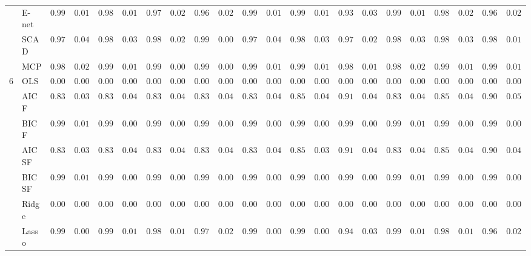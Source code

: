 \begin{tabular}{ll|ll|llllll|llllll|llllll}
 & E-net  & $0.9943$ & $0.0145$ & $0.9883$ & $0.0195$ & $0.9778$ & $0.0222$ & $0.9696$ & $0.0268$ & $0.9934$ & $0.0124$ & $0.9906$ & $0.0145$ & $0.9311$ & $0.0361$ & $0.9907$ & $0.0168$ & $0.9804$ & $0.0229$ & $0.9617$ & $0.0225$ \\
 & SCAD  & $0.9791$ & $0.0413$ & $0.9828$ & $0.0353$ & $0.9889$ & $0.0207$ & $0.9972$ & $0.0082$ & $0.9785$ & $0.0443$ & $0.9846$ & $0.0384$ & $0.9727$ & $0.0277$ & $0.9834$ & $0.0349$ & $0.9840$ & $0.0310$ & $0.9826$ & $0.0174$ \\
 & MCP  & $0.9898$ & $0.0211$ & $0.9915$ & $0.0193$ & $0.9962$ & $0.0095$ & $0.9984$ & $0.0050$ & $0.9911$ & $0.0176$ & $0.9931$ & $0.0173$ & $0.9850$ & $0.0168$ & $0.9895$ & $0.0234$ & $0.9928$ & $0.0159$ & $0.9900$ & $0.0106$ \\\hline
6 & OLS  & $0.0000$ & $0.0000$ & $0.0000$ & $0.0000$ & $0.0000$ & $0.0000$ & $0.0000$ & $0.0000$ & $0.0000$ & $0.0000$ & $0.0000$ & $0.0000$ & $0.0000$ & $0.0000$ & $0.0000$ & $0.0000$ & $0.0000$ & $0.0000$ & $0.0000$ & $0.0000$ \\
 & AIC F  & $0.8329$ & $0.0391$ & $0.8353$ & $0.0419$ & $0.8341$ & $0.0421$ & $0.8306$ & $0.0481$ & $0.8366$ & $0.0447$ & $0.8506$ & $0.0408$ & $0.9124$ & $0.0434$ & $0.8367$ & $0.0438$ & $0.8538$ & $0.0428$ & $0.9071$ & $0.0505$ \\
 & BIC F  & $0.9905$ & $0.0112$ & $0.9928$ & $0.0099$ & $0.9919$ & $0.0087$ & $0.9922$ & $0.0088$ & $0.9906$ & $0.0098$ & $0.9932$ & $0.0076$ & $0.9960$ & $0.0061$ & $0.9901$ & $0.0103$ & $0.9929$ & $0.0087$ & $0.9967$ & $0.0071$ \\
 & AIC SF  & $0.8334$ & $0.0389$ & $0.8364$ & $0.0413$ & $0.8354$ & $0.0403$ & $0.8316$ & $0.0474$ & $0.8377$ & $0.0436$ & $0.8530$ & $0.0397$ & $0.9152$ & $0.0421$ & $0.8390$ & $0.0416$ & $0.8548$ & $0.0421$ & $0.9080$ & $0.0494$ \\
 & BIC SF  & $0.9905$ & $0.0112$ & $0.9928$ & $0.0099$ & $0.9919$ & $0.0087$ & $0.9922$ & $0.0088$ & $0.9906$ & $0.0098$ & $0.9932$ & $0.0076$ & $0.9960$ & $0.0061$ & $0.9902$ & $0.0100$ & $0.9929$ & $0.0087$ & $0.9967$ & $0.0071$ \\
 & Ridge  & $0.0000$ & $0.0000$ & $0.0000$ & $0.0000$ & $0.0000$ & $0.0000$ & $0.0000$ & $0.0000$ & $0.0000$ & $0.0000$ & $0.0000$ & $0.0000$ & $0.0000$ & $0.0000$ & $0.0000$ & $0.0000$ & $0.0000$ & $0.0000$ & $0.0000$ & $0.0000$ \\
 & Lasso  & $0.9969$ & $0.0087$ & $0.9936$ & $0.0141$ & $0.9882$ & $0.0161$ & $0.9788$ & $0.0243$ & $0.9960$ & $0.0086$ & $0.9954$ & $0.0089$ & $0.9436$ & $0.0320$ & $0.9943$ & $0.0129$ & $0.9874$ & $0.0174$ & $0.9696$ & $0.0209$ \\

\end{tabular}
